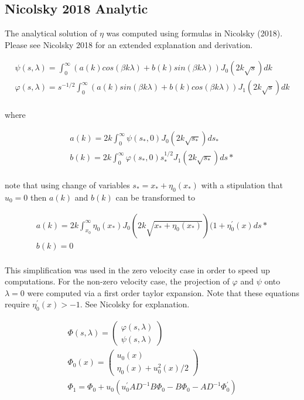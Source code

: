 \documentclass{article}
\begin{document}
\subsection{Nicolsky 2018 Analytic}

The analytical solution of $\eta$ was computed using formulas in Nicolsky (2018). Please see Nicolsky 2018 for an extended explanation and derivation.

\[
\begin{aligned}
\psi (s, \lambda ) = \int_{0}^\infty (a(k)cos(\beta k \lambda)+b(k)sin(\beta k \lambda)) J_0(2 k \sqrt s ) dk\\
\varphi (s, \lambda ) =  s^{-1/2} \int_{0}^\infty (a(k)sin(\beta k \lambda)+b(k)cos(\beta k \lambda)) J_1(2 k \sqrt s )dk \\
\end{aligned}
\]

where

\[
\begin{aligned}
a(k) = 2k \int_{0}^\infty \psi(s_*,0) J_0(2 k \sqrt {s_*})ds_*\\
b(k) = 2k \int_{0}^\infty \varphi(s_*,0) s_*^{1/2} J_1(2 k \sqrt {s_*})ds*\\
\end{aligned}
\]

note that using change of variables $s_* = x_* + \eta_0(x_*)$  with a stipulation that $u_0 = 0$ then $a(k)$ and $b(k)$ can be transformed to

\[
\begin{aligned}
a(k) = 2k \int_{x_0}^\infty \eta_0(x_*) J_0(2 k \sqrt {x_*+\eta_0(x_*)}) (1+\eta_0^{\prime}(x) ds*\\
b(k) = 0\\
\end{aligned}
\]

This simplification was used in the zero velocity case in order to speed up computations. 
For the non-zero velocity case, the projection of $\varphi$ and $\psi$ onto $\lambda = 0$ were computed via a first order taylor expansion. Note that these equations require $\eta_0^\prime(x) > -1$.  See Nicolsky for explanation.

\[
\begin{aligned}
\Phi (s,\lambda) = \begin{pmatrix}
\varphi(s,\lambda) \\
\psi(s,\lambda)
\end{pmatrix} \\
\Phi_0(x) =  \begin{pmatrix}
u_0(x) \\
\eta_0(x) + u_0^2(x)/2
\end{pmatrix} \\
\Phi_1 = \Phi_0 + u_0(u_0^\prime A D^{-1} B \Phi_0 - B \Phi_0 - A D^{-1} \Phi_0^\prime)
\end{aligned}
\]
\end{document}
